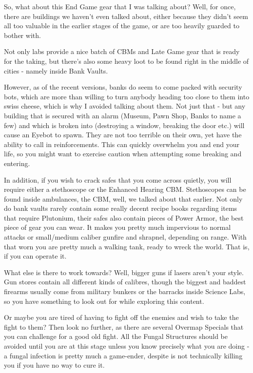 So, what about this End Game gear that I was talking about? Well, for once, there are buildings we haven't even talked about, either because they didn't seem all too valuable in the earlier stages of the game, or are too heavily guarded to bother with.

Not only labs provide a nice batch of CBMs and Late Game gear that is ready for the taking, but there's also some heavy loot to be found right in the middle of cities - namely inside Bank Vaults.

However, as of the recent versions, banks do seem to come packed with security bots, which are more than willing to turn anybody heading too close to them into swiss cheese, which is why I avoided talking about them. Not just that - but any building that is secured with an alarm (Museum, Pawn Shop, Banks to name a few) and which is broken into (destroying a window, breaking the door etc.) will cause an Eyebot to spawn. They are not too terrible on their own, yet have the ability to call in reinforcements. This can quickly overwhelm you and end your life, so you might want to exercise caution when attempting some breaking and entering.

In addition, if you wish to crack safes that you come across quietly, you will require either a stethoscope or the Enhanced Hearing CBM. Stethoscopes can be found inside ambulances, the CBM, well, we talked about that earlier. Not only do bank vaults rarely contain some really decent recipe books regarding items that require Plutonium, their safes also contain pieces of Power Armor, the best piece of gear you can wear. It makes you pretty much impervious to normal attacks or small/medium caliber gunfire and shrapnel, depending on range. With that worn you are pretty much a walking tank, ready to wreck the world. That is, if you can operate it.

What else is there to work towards? Well, bigger guns if lasers aren't your style. Gun stores contain all different kinds of calibres, though the biggest and baddest firearms usually come from military bunkers or the barracks inside Science Labs, so you have something to look out for while exploring this content.

Or maybe you are tired of having to fight off the enemies and wish to take the fight to them? Then look no further, as there are several Overmap Specials that you can challenge for a good old fight. All the Fungal Structures should be avoided until you are at this stage unless you know precisely what you are doing - a fungal infection is pretty much a game-ender, despite is not technically killing you if you have no way to cure it.

